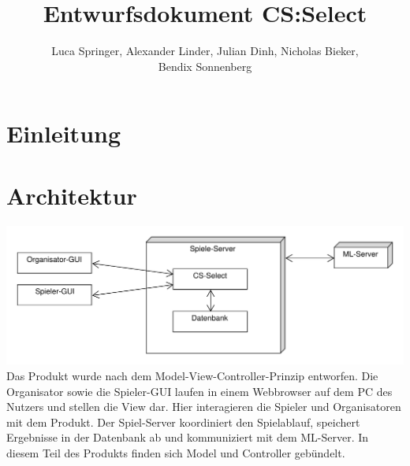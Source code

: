 \documentclass[a4paper]{scrreprt}
\begin{document}
	\title{Entwurfsdokument CS:Select}
	\author{Luca Springer, Alexander Linder, Julian Dinh, Nicholas Bieker,\\ Bendix Sonnenberg}
	\maketitle
	
	\tableofcontents


	\chapter{Einleitung}


	\chapter{Architektur}
	\includegraphics[width=\textwidth]{img/Architektur.pdf}
    Das Produkt wurde nach dem Model-View-Controller-Prinzip entworfen.
	Die Organisator sowie die Spieler-GUI laufen in einem Webbrowser auf dem PC des Nutzers und stellen die View dar.
	Hier interagieren die Spieler und Organisatoren mit dem Produkt.
	Der Spiel-Server koordiniert den Spielablauf, speichert Ergebnisse in der Datenbank ab und kommuniziert mit dem ML-Server.
    In diesem Teil des Produkts finden sich Model und Controller gebündelt.
\end{document}
